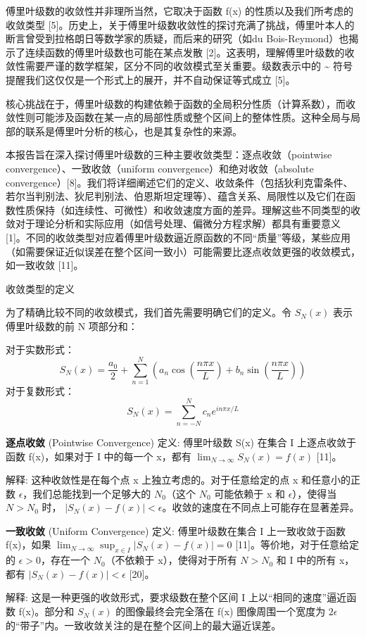 傅里叶级数的收敛性并非理所当然，它取决于函数 f(x) 的性质以及我们所考虑的收敛类型 [5]。历史上，关于傅里叶级数收敛性的探讨充满了挑战，傅里叶本人的断言曾受到拉格朗日等数学家的质疑，而后来的研究（如du Bois-Reymond）也揭示了连续函数的傅里叶级数也可能在某点发散 [2]。这表明，理解傅里叶级数的收敛性需要严谨的数学框架，区分不同的收敛模式至关重要。级数表示中的 \textasciitilde{} 符号提醒我们这仅仅是一个形式上的展开，并不自动保证等式成立 [5]。

核心挑战在于，傅里叶级数的构建依赖于函数的全局积分性质（计算系数），而收敛性则可能涉及函数在某一点的局部性质或整个区间上的整体性质。这种全局与局部的联系是傅里叶分析的核心，也是其复杂性的来源。

本报告旨在深入探讨傅里叶级数的三种主要收敛类型：逐点收敛（pointwise convergence）、一致收敛（uniform convergence）和绝对收敛（absolute convergence）[8]。我们将详细阐述它们的定义、收敛条件（包括狄利克雷条件、若尔当判别法、狄尼判别法、伯恩斯坦定理等）、蕴含关系、局限性以及它们在函数性质保持（如连续性、可微性）和收敛速度方面的差异。理解这些不同类型的收敛对于理论分析和实际应用（如信号处理、偏微分方程求解）都具有重要意义 [1]。不同的收敛类型对应着傅里叶级数逼近原函数的不同“质量”等级，某些应用（如需要保证近似误差在整个区间一致小）可能需要比逐点收敛更强的收敛模式，如一致收敛 [11]。

收敛类型的定义

为了精确比较不同的收敛模式，我们首先需要明确它们的定义。令 $S_N(x)$ 表示傅里叶级数的前 N 项部分和：

对于实数形式：
\[
S_N(x) = \frac{a_0}{2} + \sum_{n=1}^{N} \left( a_n \cos\left(\frac{n\pi x}{L}\right) + b_n \sin\left(\frac{n\pi x}{L}\right) \right)
\]
对于复数形式：
\[
S_N(x) = \sum_{n=-N}^{N} c_n e^{i n \pi x / L}
\]
\begin{definition}
\textbf{逐点收敛} (Pointwise Convergence)
定义: 傅里叶级数 S(x) 在集合 I 上逐点收敛于函数 f(x)，如果对于 I 中的每一个 x，都有 $\lim_{N\to\infty}S_N(x)=f(x)$ [11]。
\end{definition}
解释: 这种收敛性是在每个点 x 上独立考虑的。对于任意给定的点 x 和任意小的正数 $\epsilon$，我们总能找到一个足够大的 $N_0$（这个 $N_0$ 可能依赖于 x 和 $\epsilon$），使得当 $N>N_0$ 时， $|S_N(x)−f(x)|<\epsilon$。收敛的速度在不同点上可能存在显著差异。

\begin{definition}
\textbf{一致收敛} (Uniform Convergence)
定义: 傅里叶级数在集合 I 上一致收敛于函数 f(x)，如果 $\lim_{N\to\infty}\sup_{x\in I}|S_N(x)−f(x)|=0$ [11]。等价地，对于任意给定的 $\epsilon>0$，存在一个 $N_0$（不依赖于 x），使得对于所有 $N>N_0$ 和 I 中的所有 x，都有 $|S_N(x)−f(x)|<\epsilon$ [20]。
\end{definition}
解释: 这是一种更强的收敛形式，要求级数在整个区间 I 上以“相同的速度”逼近函数 f(x)。部分和 $S_N(x)$ 的图像最终会完全落在 f(x) 图像周围一个宽度为 $2\epsilon$ 的“带子”内。一致收敛关注的是在整个区间上的最大逼近误差。

